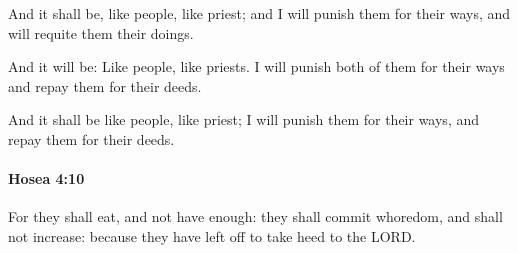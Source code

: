 			\begin{versebox}
					\item[BHS] 
					\item[LXX] 
					\item[ASV] And it shall be, like people, like priest; and I will punish them for their ways, and will requite them their doings.
					\item[NIV] And it will be: Like people, like priests. I will punish both of them for their ways and repay them for their deeds.
					\item[NRSV] And it shall be like people, like priest; I will punish them for their ways, and repay them for their deeds.
			\end{versebox}

		\paragraph{Hosea 4:10} %
			\label{HOSEA-4-10}

			For they shall eat, and not have enough: they shall commit whoredom, and shall not increase: because they have left off to take heed to the LORD.

